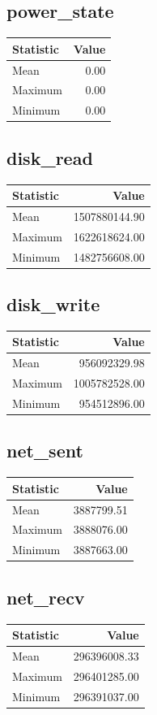 \documentclass[11pt]{article}
\begin{document}
\subsection{power_state}
\begin{tabular}{lr}
\toprule
Statistic & Value \\
\midrule
Mean & 0.00 \\
Maximum & 0.00 \\
Minimum & 0.00 \\
\bottomrule
\end{tabular}


\subsection{disk_read}
\begin{tabular}{lr}
\toprule
Statistic & Value \\
\midrule
Mean & 1507880144.90 \\
Maximum & 1622618624.00 \\
Minimum & 1482756608.00 \\
\bottomrule
\end{tabular}


\subsection{disk_write}
\begin{tabular}{lr}
\toprule
Statistic & Value \\
\midrule
Mean & 956092329.98 \\
Maximum & 1005782528.00 \\
Minimum & 954512896.00 \\
\bottomrule
\end{tabular}


\subsection{net_sent}
\begin{tabular}{lr}
\toprule
Statistic & Value \\
\midrule
Mean & 3887799.51 \\
Maximum & 3888076.00 \\
Minimum & 3887663.00 \\
\bottomrule
\end{tabular}


\subsection{net_recv}
\begin{tabular}{lr}
\toprule
Statistic & Value \\
\midrule
Mean & 296396008.33 \\
Maximum & 296401285.00 \\
Minimum & 296391037.00 \\
\bottomrule
\end{tabular}
\end{document}
